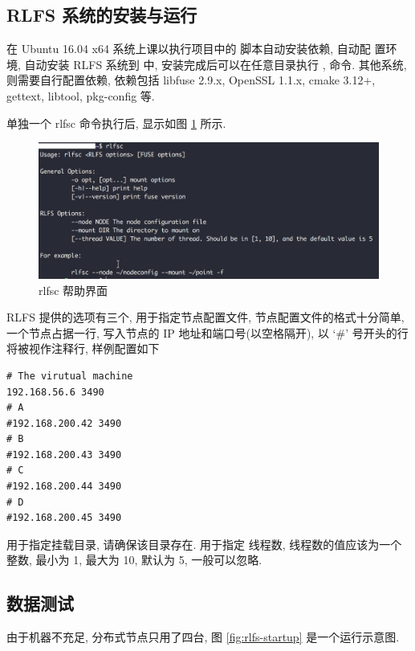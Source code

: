\subsection{RLFS 系统的安装与运行}

在 Ubuntu 16.04 x64 系统上课以执行项目中的  脚本自动安装依赖, 自动配
置环境, 自动安装 RLFS 系统到  中, 安装完成后可以在任意目录执行
,  命令. 其他系统, 则需要自行配置依赖, 依赖包括 libfuse 2.9.x,
OpenSSL 1.1.x, cmake 3.12+, gettext, libtool,  pkg-config 等.

单独一个 rlfsc 命令执行后, 显示如图 \ref{fig:rlfsc-help} 所示.

\begin{figure}[H]
    \centerline{\includegraphics[width=1.0\textwidth]{./Figures/rlfsc-help.png}}
    \caption{rlfsc 帮助界面}
    \label{fig:rlfsc-help}
\end{figure}

RLFS 提供的选项有三个,  用于指定节点配置文件, 节点配置文件的格式十分简单,
一个节点占据一行, 写入节点的 IP 地址和端口号(以空格隔开), 以 `\#' 号开头的行将被视作注释行,
样例配置如下

\begin{lstlisting}[style=verb]
# The virutual machine
192.168.56.6 3490
# A
#192.168.200.42 3490
# B
#192.168.200.43 3490
# C
#192.168.200.44 3490
# D
#192.168.200.45 3490
\end{lstlisting}

 用于指定挂载目录, 请确保该目录存在.  用于指定
线程数, 线程数的值应该为一个整数, 最小为 1, 最大为 10, 默认为 5, 一般可以忽略.

\subsection{数据测试}
由于机器不充足, 分布式节点只用了四台, 图 \ref{fig:rlfs-startup} 是一个运行示意图.

